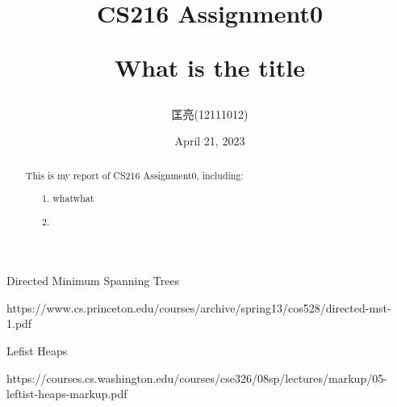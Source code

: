 \documentclass{article}
\title{CS216 Assignment0 \\ {\begin{large} What is the title \end{large}}}  %
\author{匡亮(12111012)}
\date{April 21, 2023}  %
\begin{document}
\maketitle

\renewcommand\abstractname{Abstract}
\begin{abstract}

This is my report of CS216 Assignment0, including:

\begin{itemize}
    \item[1.] whatwhat
    \item[2.] 
\end{itemize}

\end{abstract}

\newpage %

\renewcommand\contentsname{Contents}
\tableofcontents

\newpage  %



\newpage  %

\renewcommand\refname{References}
\begin{thebibliography}{99}
     Directed Minimum Spanning Trees

    https://www.cs.princeton.edu/courses/archive/spring13/cos528/directed-mst-1.pdf
    
     Lefist Heaps

    https://courses.cs.washington.edu/courses/cse326/08sp/lectures/markup/05-leftist-heaps-markup.pdf
\end{thebibliography}
\end{document}
